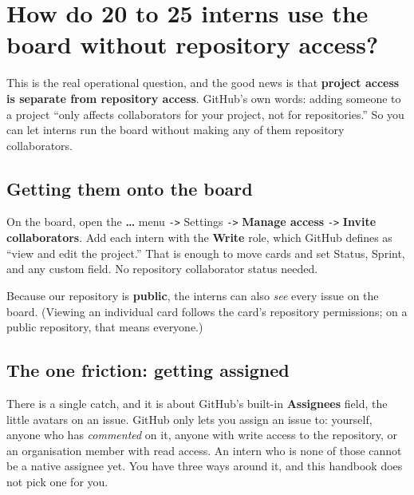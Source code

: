 \documentclass[11pt,a4paper]{report}
\newcommand{\code}[1]{\texttt{#1}}
\begin{document}
\chapter{How do 20 to 25 interns use the board without repository access?}

This is the real operational question, and the good news is that \textbf{project
access is separate from repository access}. GitHub's own words: adding someone to a
project ``only affects collaborators for your project, not for repositories.'' So
you can let interns run the board without making any of them repository
collaborators.

\section{Getting them onto the board}
On the board, open the \textbf{\ldots} menu \code{->} Settings \code{->} \textbf{Manage
access} \code{->} \textbf{Invite collaborators}. Add each intern with the
\textbf{Write} role, which GitHub defines as ``view and edit the project.'' That is
enough to move cards and set Status, Sprint, and any custom field. No repository
collaborator status needed.

Because our repository is \textbf{public}, the interns can also \emph{see} every
issue on the board. (Viewing an individual card follows the card's repository
permissions; on a public repository, that means everyone.)

\section{The one friction: getting assigned}
There is a single catch, and it is about GitHub's built-in \textbf{Assignees} field,
the little avatars on an issue. GitHub only lets you assign an issue to: yourself,
anyone who has \emph{commented} on it, anyone with write access to the repository, or
an organisation member with read access. An intern who is none of those cannot be a
native assignee yet. You have three ways around it, and this handbook does not pick
one for you.
\end{document}
